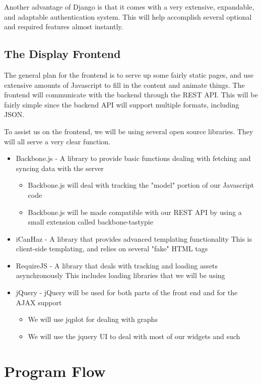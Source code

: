 Another advantage of Django is that it comes with a very extensive, expandable, and adaptable authentication system.
This will help accomplish several optional and required features almost instantly.


\subsection{The Display Frontend}

The general plan for the frontend is to serve up some fairly static pages, and use extensive amounts of Javascript to fill in the content and animate things.
The frontend will communicate with the backend through the REST API.
This will be fairly simple since the backend API will support multiple formats, including JSON.

To assist us on the frontend, we will be using several open source libraries.
They will all serve a very clear function.

\begin{itemize}
 \item Backbone.js - A library to provide basic functions dealing with fetching and syncing data with the server
 \begin{itemize}
  \item Backbone.js will deal with tracking the "model" portion of our Javascript code
  \item Backbone.js will be made compatible with our REST API by using a small extension called backbone-tastypie
 \end{itemize}
 \item iCanHaz - A library that provides advanced templating functionality
This is client-side templating, and relies on several "fake" HTML tags
 \item RequireJS - A library that deals with tracking and loading assets asynchronously
This includes loading libraries that we will be using
 \item jQuery - jQuery will be used for both parts of the front end and for the AJAX support
 \begin{itemize}
  \item We will use jqplot for dealing with graphs
  \item We will use the jquery UI to deal with most of our widgets and such
 \end{itemize}
\end{itemize}

\section{Program Flow}

